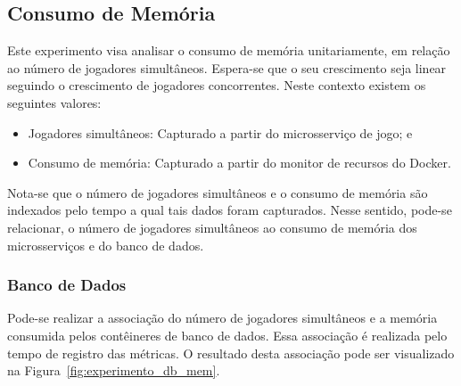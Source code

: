 \subsection{Consumo de Memória}



Este experimento visa analisar o consumo de memória unitariamente, em relação ao número de jogadores simultâneos.
%
Espera-se que o seu crescimento seja linear seguindo o crescimento de jogadores concorrentes.
%
Neste contexto existem os seguintes valores:



\begin{itemize}
    \item Jogadores simultâneos: Capturado a partir do microsserviço de jogo; e
    \item Consumo de memória: Capturado a partir do monitor de recursos do Docker.
\end{itemize}

Nota-se que o número de jogadores simultâneos e o consumo de memória são indexados pelo tempo a qual tais dados foram capturados.
%
Nesse sentido, pode-se relacionar, o número de jogadores simultâneos ao consumo de memória dos microsserviços e do banco de dados.
%

\subsubsection{Banco de Dados}



Pode-se realizar a associação do número de jogadores simultâneos e a memória consumida pelos contêineres de banco de dados.
%
Essa associação é realizada pelo tempo de registro das métricas.
%
O resultado desta associação pode ser visualizado na Figura~\ref{fig:experimento_db_mem}.


